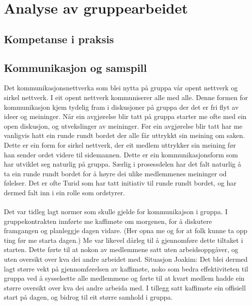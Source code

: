 

\chapter{Analyse av gruppearbeidet}
\section{Kompetanse i praksis}

\section{Kommunikasjon og samspill}
Det kommunikasjonsnettverka som blei nytta på gruppa vår opent nettverk og sirkel nettverk. I eit opent nettverk kommuniserer alle med alle. Denne formen for kommunikasjon kjem tydelig fram i diskusjoner på gruppa der det er fri flyt av ideer og meininger. Når ein avgjørelse blir tatt på gruppa starter me ofte med ein open diskusjon, og utvekslinger av meininger. Før ein avgjørelse blir tatt har me vanligvis hatt ein runde rundt bordet der alle får uttrykkt sin meining om saken. Dette er ein form for sirkel nettverk, der eit medlem uttrykker sin meining før han sender ordet videre til sidemannen. Dette er ein kommunikasjonsform som har utviklet seg naturlig på gruppa. Særlig i prosessdelen har det falt naturlig å ta ein runde rundt bordet for å høyre dei ulike medlemmenes meininger od følelser. Det er ofte Turid som har tatt initiativ til runde rundt bordet, og har dermed falt inn i ein rolle som ordstyrer. 
\\
\\
Det var tidleg lagt normer som skulle gjelde for kommunikajson i gruppa. I gruppekontrakten innførte me kaffimøte om morgenen, for å diskutere framgangen og planleggje dagen vidare. (Her opna me og for at folk kunne ta opp ting før me starta dagen.) Me var likevel dårleg til å gjennomføre dette tiltaket i starten. Dette førte til at nokon av medlemmene satt uten arbeidsoppgåver, og uten oversikt over kva dei andre arbeidet med. 
Situasjon Joakim:
Det blei dermed lagt større vekt på gjennomførelsen av kaffimøte, noko som bedra effektiviteten til gruppa ved å sysselsette alle medlemmene og førte til at kvart medlem hadde ein større oversikt over kva dei andre arbeida med. I tillegg satt kaffimøte ein offisiell start på dagen, og bidrog til eit større samhold i gruppa. 
